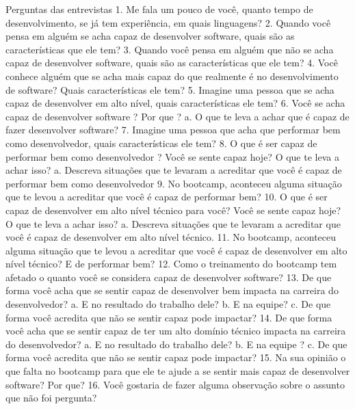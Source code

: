 \documentclass{TheMartianReport}
\begin{document}
Perguntas das entrevistas
1.	Me fala um pouco de você, quanto tempo de desenvolvimento, se já tem experiência, em quais linguagens?
2.	Quando você pensa em alguém se acha capaz de desenvolver software, quais são as características que ele tem?
3.	Quando você pensa em alguém que não se acha capaz de desenvolver software, quais são as características que ele tem?
4.	Você conhece alguém que se acha mais capaz do que realmente é no desenvolvimento de software? Quais características ele tem?
5.	Imagine uma pessoa que se acha capaz de desenvolver em alto nível, quais características ele tem?
6.	Você se acha capaz de desenvolver software ? Por que ?
a.	O que te leva a achar que é capaz de fazer desenvolver software?
7.	Imagine uma pessoa que acha que performar bem como desenvolvedor, quais características ele tem?
8.	O que é ser capaz de performar bem como desenvolvedor ? Você se sente capaz hoje? O que te leva a achar isso?
a.	Descreva situações que te levaram a acreditar que você é capaz de performar bem como desenvolvedor
9.	No bootcamp, aconteceu alguma situação que te levou a acreditar que você é capaz de performar bem?
10.	O que é ser capaz de desenvolver em alto nível técnico para você? Você se sente capaz hoje? O que te leva a achar isso?
a.	Descreva situações que te levaram a acreditar que você é capaz de desenvolver em alto nível técnico.
11.	No bootcamp, aconteceu alguma situação que te levou a acreditar que você é capaz de desenvolver em alto nível técnico? E de performar bem? 
12.	Como o treinamento do bootcamp tem afetado o quanto você se considera capaz de desenvolver software?
13.	De que forma você acha que se sentir capaz de desenvolver bem impacta na carreira do desenvolvedor? 
a.	E no resultado do trabalho dele? 
b.	E na equipe? 
c.	De que forma você acredita que não se sentir capaz pode impactar?
14.	De que forma você acha que se sentir capaz de ter um alto domínio técnico impacta na carreira do desenvolvedor? 
a.	E no resultado do trabalho dele? 
b.	E na equipe ? 
c.	De que forma você acredita que não se sentir capaz pode impactar?
15.	Na sua opinião o que falta no bootcamp para que ele te ajude a se sentir mais capaz de desenvolver software? Por que?
16.	Você gostaria de fazer alguma observação sobre o assunto que não foi pergunta? 



\end{document}
